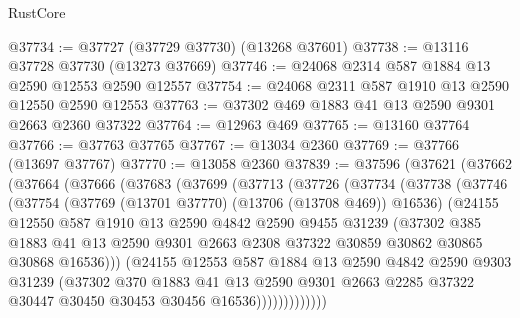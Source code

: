 \begin{lexlean}{RustCore}
\begin{coremodule}
@37734 := @37727 (@37729 @37730) (@13268 @37601)
@37738 := @13116 @37728 @37730 (@13273 @37669)
@37746 := @24068 @2314 @587 @1884 @13 @2590 @12553 @2590 @12557
@37754 := @24068 @2311 @587 @1910 @13 @2590 @12550 @2590 @12553
@37763 := @37302 @469 @1883 @41 @13 @2590 @9301 @2663 @2360 @37322
@37764 := @12963 @469
@37765 := @13160 @37764
@37766 := @37763 @37765
@37767 := @13034 @2360
@37769 := @37766 (@13697 @37767)
@37770 := @13058 @2360
@37839 := @37596
    (@37621
      (@37662
        (@37664
          (@37666
            (@37683
              (@37699
                (@37713
                  (@37726
                    (@37734
                      (@37738
                        (@37746
                          (@37754
                            (@37769 (@13701 @37770) (@13706 (@13708 @469)) @16536)
                            (@24155
                              @12550
                              @587
                              @1910
                              @13
                              @2590
                              @4842
                              @2590
                              @9455
                              @31239
                              (@37302
                                @385
                                @1883
                                @41
                                @13
                                @2590
                                @9301
                                @2663
                                @2308
                                @37322
                                @30859
                                @30862
                                @30865
                                @30868
                                @16536)))
                          (@24155
                            @12553
                            @587
                            @1884
                            @13
                            @2590
                            @4842
                            @2590
                            @9303
                            @31239
                            (@37302
                              @370
                              @1883
                              @41
                              @13
                              @2590
                              @9301
                              @2663
                              @2285
                              @37322
                              @30447
                              @30450
                              @30453
                              @30456
                              @16536)))))))))))))

\end{coremodule}
\end{lexlean}
